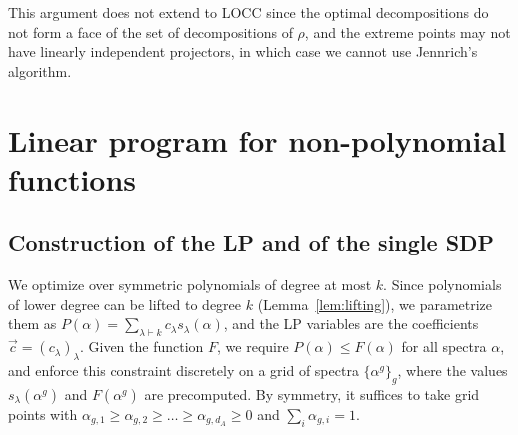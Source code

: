 \documentclass[aps,pra,twocolumn,superscriptaddress]{revtex4-2}
\renewcommand{\a}{\alpha}
\begin{document}
\begin{widetext}
This argument does not extend to LOCC since the optimal decompositions do not form a face of the set of decompositions of $\rho$, and the extreme points may not have linearly independent projectors, in which case we cannot use Jennrich's algorithm.

\section{Linear program for non-polynomial functions}\label{app:LP}

\subsection{Construction of the LP and of the single SDP}
We optimize over symmetric polynomials of degree at most $k$. Since polynomials of lower degree can be lifted to degree $k$ (Lemma~\ref{lem:lifting}), we parametrize them as $P(\a)=\sum_{\lambda\vdash k}c_\lambda s_\lambda(\a)$, and the LP variables are the coefficients $\vec c=(c_\lambda)_\lambda$. Given the function $F$, we require $P(\a)\leq F(\a)$ for all spectra $\a$, and enforce this constraint discretely on a grid of spectra $\{\a^g\}_g$, where the values $s_\lambda(\a^g)$ and $F(\a^g)$ are precomputed. By symmetry, it suffices to take grid points with $\a_{g,1}\geq\a_{g,2}\geq\dots\geq\a_{g,d_A}\geq0$ and $\sum_i\a_{g,i}=1$.


\end{widetext}
\end{document}
